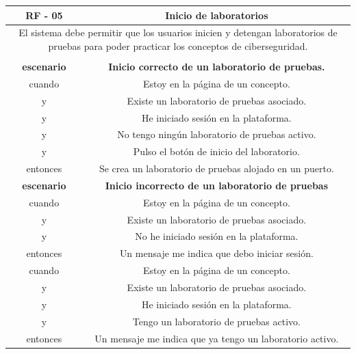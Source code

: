         \begin{table}[!htbp]
            \centering

            \begin{tabular}{|c|c|}
                \hline
                \textbf{RF - 05} & \textbf{Inicio de laboratorios} \\
                \hline
                \multicolumn{2}{|p{15cm}|}{
                    El sistema debe permitir que los usuarios inicien y detengan laboratorios de pruebas para poder practicar los conceptos de ciberseguridad.
                } \\                    
                \hline
                \multicolumn{2}{|p{15cm}|}{
                } \\
                \hline
                \textbf{escenario} & \textbf{Inicio correcto de un laboratorio de pruebas.} \\
                cuando & Estoy en la página de un concepto. \\
                y & Existe un laboratorio de pruebas asociado. \\
                y & He iniciado sesión en la plataforma. \\
                y & No tengo ningún laboratorio de pruebas activo. \\
                y & Pulso el botón de inicio del laboratorio. \\
                entonces & Se crea un laboratorio de pruebas alojado en un puerto. \\
                \hline
                \textbf{escenario} & \textbf{Inicio incorrecto de un laboratorio de pruebas} \\
                cuando & Estoy en la página de un concepto. \\
                y & Existe un laboratorio de pruebas asociado. \\
                y & No he iniciado sesión en la plataforma. \\
                entonces & Un mensaje me indica que debo iniciar sesión. \\
                cuando & Estoy en la página de un concepto. \\
                y & Existe un laboratorio de pruebas asociado. \\
                y & He iniciado sesión en la plataforma. \\
                y & Tengo un laboratorio de pruebas activo. \\
                entonces & Un mensaje me indica que ya tengo un laboratorio activo. \\
                \hline

            \end{tabular}
        \end{table}

